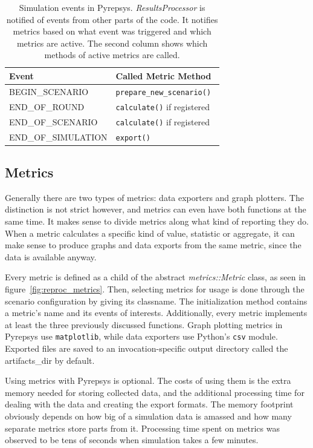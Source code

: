 \documentclass[%
    ]{\PathToTumTemplate/thesis/tum_thesis}
\begin{document}
\begin{table}[tbp]
\centering
\begin{tabular}{ll}
\toprule
\textbf{Event}        & \textbf{Called Metric Method} \\ \midrule
BEGIN\_SCENARIO       & \texttt{prepare\_new\_scenario() } \\
END\_OF\_ROUND        & \texttt{calculate()} if registered \\
END\_OF\_SCENARIO     & \texttt{calculate()} if registered \\
END\_OF\_SIMULATION   &  \texttt{export()} \\
\bottomrule
\end{tabular}
\caption{
	Simulation events in Pyrepsys.
	\emph{ResultsProcessor} is notified of events from other parts of the code.
	It notifies metrics based on what event was triggered and which metrics are active.
	The second column shows which methods of active metrics are called.
}
\label{tab:simulation_events}
\end{table}


\subsection{Metrics}

Generally there are two types of metrics: data exporters and graph plotters.
The distinction is not strict however, and metrics can even have both functions at the same time.
It makes sense to divide metrics along what kind of reporting they do.
When a metric calculates a specific kind of value, statistic or aggregate, it can make sense to produce graphs and data exports from the same metric, since the data is available anyway.

Every metric is defined as a child of the abstract \emph{metrics::Metric} class, as seen in figure~\ref{fig:reproc_metrics}.
Then, selecting metrics for usage is done through the scenario configuration by giving its classname.
The initialization method contains a metric's name and its events of interests.
Additionally, every metric implements at least the three previously discussed functions.
Graph plotting metrics in Pyrepsys use \texttt{matplotlib}, while data exporters use Python's \texttt{csv} module.
Exported files are saved to an invocation-specific output directory called the \gls{artifacts_dir} by default.

Using metrics with Pyrepsys is optional.
The costs of using them is the extra memory needed for storing collected data, and the additional processing time for dealing with the data and creating the export formats.
The memory footprint obviously depends on how big of a simulation data is amassed and how many separate metrics store parts from it.
Processing time spent on metrics was observed to be tens of seconds when simulation takes a few minutes.
\end{document}
